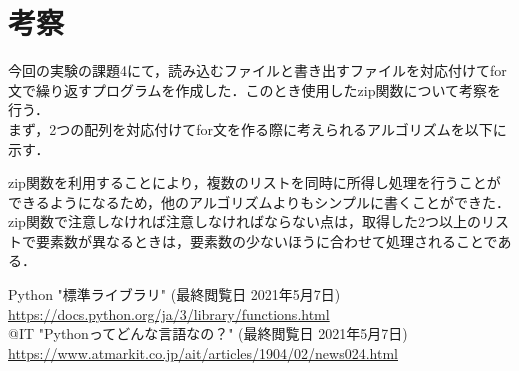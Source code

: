 \documentclass[a4paper,11pt]{jsarticle}
\begin{document}
\section{考察}
  今回の実験の課題4にて，読み込むファイルと書き出すファイルを対応付けてfor文で繰り返すプログラムを作成した．このとき使用したzip関数について考察を行う．\cite{zip}\\
  まず，2つの配列を対応付けてfor文を作る際に考えられるアルゴリズムを以下に示す．
  
  zip関数を利用することにより，複数のリストを同時に所得し処理を行うことができるようになるため，他のアルゴリズムよりもシンプルに書くことができた．
  zip関数で注意しなければ注意しなければならない点は，取得した2つ以上のリストで要素数が異なるときは，要素数の少ないほうに合わせて処理されることである．

  \begin{thebibliography}{1}
     Python "標準ライブラリ" (最終閲覧日 2021年5月7日)\\ \url{https://docs.python.org/ja/3/library/functions.html}\\
     @IT "Pythonってどんな言語なの？" (最終閲覧日 2021年5月7日)\\ \url{https://www.atmarkit.co.jp/ait/articles/1904/02/news024.html}\\
  \end{thebibliography}
\end{document}
